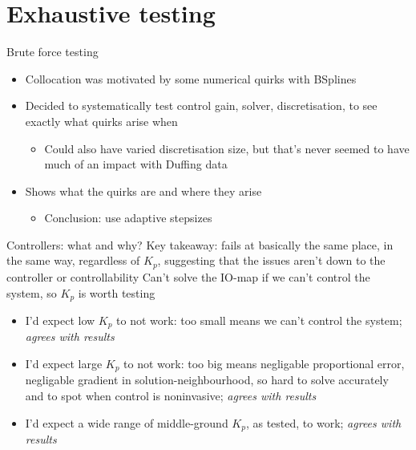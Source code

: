 \documentclass[presentation]{beamer}
\begin{document}
\section{Exhaustive testing}
\label{sec:orga95c3a4}
\begin{frame}[label={sec:org8b83fa3}]{Brute force testing}
\begin{itemize}
\item Collocation was motivated by some numerical quirks with BSplines
\end{itemize}
\vfill
\begin{itemize}
\item Decided to systematically test control gain, solver, discretisation, to see exactly what quirks arise when
\begin{itemize}
\item Could also have varied discretisation size, but that's never seemed to have much of an impact with Duffing data
\end{itemize}
\end{itemize}
\vfill
\begin{itemize}
\item Shows what the quirks are and where they arise
\begin{itemize}
\item Conclusion: use adaptive stepsizes
\end{itemize}
\end{itemize}
\end{frame}

\begin{frame}[label={sec:org4869f2e}]{Controllers: what and why?}
\alert{Key takeaway: fails at basically the same place, in the same way, regardless of \(K_p\), suggesting that the issues aren't down to the controller or controllability}
\vfill
Can't solve the IO-map if we can't control the system, so \(K_p\) is worth testing
\vfill
\begin{itemize}
\item I'd expect low \(K_p\) to not work: too small means we can't control the system; \emph{agrees with results}
\item I'd expect large \(K_p\) to not work: too big means negligable proportional error, negligable gradient in solution-neighbourhood, so hard to solve accurately and to spot when control is noninvasive; \emph{agrees with results}
\item I'd expect a wide range of middle-ground \(K_p\), as tested, to work; \emph{agrees with results}
\end{itemize}
\end{frame}
\end{document}
